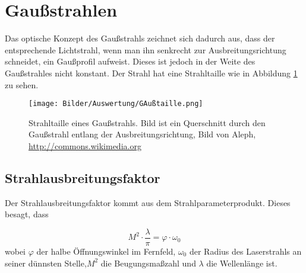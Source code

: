 \section{Gaußstrahlen}
\label{section:Gaussian}

Das optische Konzept des Gaußstrahls zeichnet sich dadurch aus, dass der entsprechende Lichtstrahl, 
wenn man ihn senkrecht zur Ausbreitungsrichtung schneidet, ein Gaußprofil aufweist.
Dieses ist jedoch in der Weite des Gaußstrahles nicht konstant. Der Strahl hat eine 
Strahltaille wie in Abbildung \ref{bild:taille} zu sehen.

\begin{figure}[ht]
    \centering
    \texttt{[image: Bilder/Auswertung/GAußtaille.png]}
    \caption{Strahltaille eines Gaußstrahls. Bild ist ein Querschnitt durch den Gaußstrahl entlang der Ausbreitungsrichtung, 
    Bild von Aleph, \url{http://commons.wikimedia.org}}
    \label{bild:taille}
\end{figure}

\subsection*{Strahlausbreitungsfaktor}

Der Strahlausbreitungsfaktor kommt aus dem Strahlparameterprodukt. Dieses besagt, dass 

\begin{equation*}
    M^2 \cdot \frac{\lambda}{\pi} = \varphi \cdot \omega_0
\end{equation*}
wobei $\varphi$ der halbe Öffnungswinkel im Fernfeld, $\omega_0$ der Radius des Laserstrahls an seiner dünnsten Stelle,$M^2$ die Beugungsmaßzahl
und $\lambda$ die Wellenlänge ist.